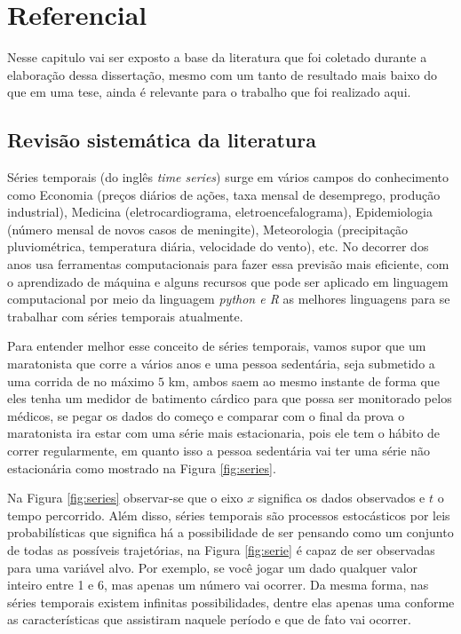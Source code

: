 \section{Referencial}\label{sec:refteo}

Nesse capitulo vai ser exposto a base da literatura que foi coletado durante a elaboração dessa dissertação, mesmo com um tanto de resultado mais baixo do que em uma tese, ainda é relevante para o trabalho que foi realizado aqui.


    

\subsection{Revis\~ao sistem\'atica da literatura} \label{subsec:revisão}

Séries temporais (do inglês \textit{time series}) surge em vários campos do conhecimento como Economia (preços diários de ações, taxa mensal de desemprego, produção industrial), Medicina (eletrocardiograma, eletroencefalograma), Epidemiologia (número mensal de novos casos de meningite), Meteorologia (precipitação pluviométrica, temperatura diária, velocidade do vento), etc. No decorrer dos anos usa ferramentas computacionais para fazer essa previsão mais eficiente, com o aprendizado de máquina e alguns recursos que pode ser aplicado em linguagem computacional por meio da linguagem \textit{python e R}  as melhores linguagens para se trabalhar com séries temporais atualmente.

Para entender melhor esse conceito de séries temporais, vamos supor que um maratonista que corre a vários anos e uma pessoa sedentária, seja submetido a uma corrida de no máximo $5$ km, ambos saem ao mesmo instante de forma que eles tenha um medidor de batimento cárdico para que possa ser monitorado pelos médicos, se pegar os dados do começo e comparar com o final da prova o maratonista ira estar com uma série mais estacionaria, pois ele tem o hábito de correr regularmente, em quanto isso a pessoa sedentária vai ter uma série não estacionária como mostrado na Figura \ref{fig:series}.



Na Figura \ref{fig:series} observar-se que o eixo $x$ significa os dados observados e $t$ o tempo percorrido.
Além disso, séries temporais são processos estocásticos por leis probabilísticas que significa há a possibilidade de ser pensando como um conjunto de todas as possíveis trajetórias, na Figura \ref{fig:serie} é capaz de ser observadas para uma variável alvo. Por exemplo, se você jogar um dado qualquer valor inteiro entre 1 e 6, mas apenas um número vai ocorrer. Da mesma forma, nas séries temporais existem infinitas possibilidades, dentre elas apenas uma conforme as características que assistiram naquele período e que de fato vai ocorrer.

